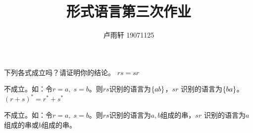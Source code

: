 \documentclass{ctexart}
\title{形式语言第三次作业}
\author{卢雨轩 19071125}
\DeclarePairedDelimiter{\set}{\{}{\}}
\begin{document}
\maketitle

\begin{outline}[enumerate]
    \1[4.] 下列各式成立吗？请证明你的结论。
        \2[(3)] $rs = sr$
        
        不成立。如：令$r = a,\;s = b$。则$rs$识别的语言为$\set{ab}$，$sr$
        识别的语言为$\set{ba}$。
        \2[(6)] $(r+s)^* = r^* + s^*$

        不成立。如：令$r = a,\;s = b$。则$rs$识别的语言为$a,b$组成的串，$sr$
        识别的语言为$a$组成的串或$b$组成的串。
\end{outline}
\end{document}
